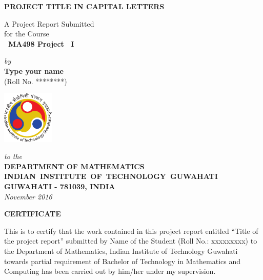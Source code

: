 \documentclass[12pt,a4paper]{report}
\theoremstyle{plain}
\theoremstyle{definition}
\theoremstyle{remark}
\begin{document}


\begin{titlepage}
\enlargethispage{3cm}

\begin{center}

\vspace*{-2cm}

\textbf{\Large PROJECT TITLE IN CAPITAL LETTERS}

\vfill

 A Project Report Submitted \\
for the Course \\[1cm]

{\bf\Large\ MA498 Project ~I }\\[.1in]

 \vfill

{\large \emph{by}}\\[5pt]
{\large\bf {Type your name}}\\[5pt]
{\large (Roll No. ********)}

\vfill
\includegraphics[height=2.5cm]{iitglogo}

\vspace*{0.5cm}

{\em\large to the}\\[10pt]
{\bf\large DEPARTMENT OF MATHEMATICS} \\[5pt]
{\bf\large \mbox{INDIAN INSTITUTE OF TECHNOLOGY GUWAHATI}}\\[5pt]
{\bf\large GUWAHATI - 781039, INDIA}\\[10pt]
{\it\large November 2016}
\end{center}

\end{titlepage}

\clearpage

 \setcounter{page}{2}
\begin{center}
{\Large{\bf{CERTIFICATE}}}
\end{center}


\noindent
This is to certify that the work contained in this project report entitled 
“Title of the project report” submitted by Name of the Student (Roll No.: xxxxxxxxx) 
to the Department of Mathematics, Indian Institute of Technology Guwahati towards partial requirement of
Bachelor of Technology in Mathematics and Computing has been carried out by him/her under
my supervision. \\
\end{document}
